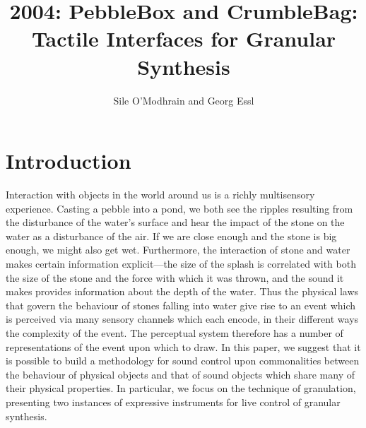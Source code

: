 
\graphicspath{ {mainmatter/Omodhrain_2004/} }

\title*{2004: PebbleBox and CrumbleBag: Tactile Interfaces for Granular Synthesis}

\author{Sile O'Modhrain and Georg Essl}


%
%
\maketitle


\section{Introduction}

Interaction with objects in the world around us is a richly multisensory experience.  Casting a pebble into a pond, we both see the ripples resulting from the disturbance of the water's surface and hear the impact of the stone on the water as a disturbance of the air.  If we are close enough and the stone is big enough, we might also get wet.  Furthermore, the interaction of stone and water makes certain information explicit---the size of the splash is correlated with both the size of the stone and the force with which it was thrown, and the sound it makes provides information about the depth of the water.  Thus the physical laws that govern the behaviour of stones falling into water give rise to an event which is perceived via many sensory channels which each encode, in their different ways the complexity of the event.  The perceptual system therefore has a number of representations of the event upon which to draw.  In this paper, we suggest that it is possible to build a methodology for sound control upon commonalities between the behaviour of physical objects and that of sound objects which share many of their physical properties.  In particular, we focus on the technique of granulation, presenting two instances of expressive instruments for live control of granular 
synthesis. 

